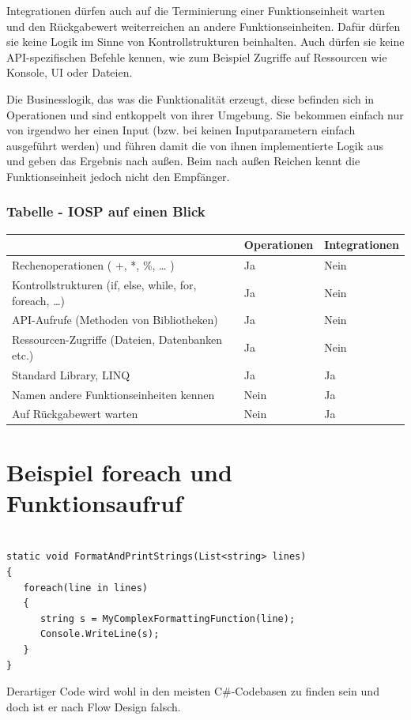 \begin{enumerate}
Integrationen dürfen auch auf die Terminierung einer Funktionseinheit warten und den Rückgabewert  weiterreichen an andere Funktionseinheiten.
Dafür dürfen sie keine Logik im Sinne von Kontrollstrukturen beinhalten.
Auch dürfen sie keine API-spezifischen Befehle kennen, wie zum Beispiel Zugriffe
auf Ressourcen wie Konsole, UI oder Dateien.

Die Businesslogik, das was die Funktionalität erzeugt, diese befinden sich in Operationen und sind entkoppelt von ihrer Umgebung.
Sie bekommen einfach nur von irgendwo her einen Input (bzw. bei keinen Inputparametern einfach ausgeführt werden) und führen damit die von ihnen implementierte
Logik aus und geben das Ergebnis nach außen. Beim nach außen Reichen kennt die Funktionseinheit jedoch nicht den Empfänger.
\end{enumerate}

\subsubsection{Tabelle -  IOSP auf einen Blick}


\bigskip
\begin{tabularx}{\textwidth}{lll}
 & Operationen & Integrationen\\
\hline
Rechenoperationen ( +, *, \%, \ldots{} ) & Ja & Nein\\
Kontrollstrukturen (if, else, while, for, foreach, \ldots{}) & Ja & Nein\\
API-Aufrufe (Methoden von Bibliotheken) & Ja & Nein\\
Ressourcen-Zugriffe (Dateien, Datenbanken etc.) & Ja & Nein\\
Standard Library, LINQ & Ja & Ja\\
Namen andere Funktionseinheiten kennen & Nein & Ja\\
Auf Rückgabewert warten & Nein & Ja\\
\end{tabularx}



\section{Beispiel foreach und Funktionsaufruf}




\begin{lstlisting}[caption=FormatAndPrintStrings nicht IOSP-konfrom]

static void FormatAndPrintStrings(List<string> lines)
{
   foreach(line in lines)
   {
      string s = MyComplexFormattingFunction(line);
      Console.WriteLine(s);
   }
}
\end{lstlisting}
Derartiger Code wird wohl in den meisten C\#-Codebasen zu finden sein und doch ist er nach Flow Design falsch.

